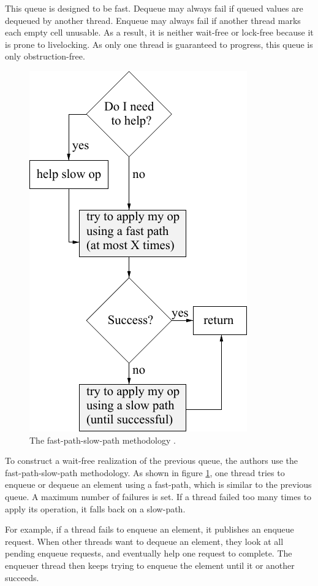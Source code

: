 This queue is designed to be fast. Dequeue may always fail if queued values are
dequeued by another thread. Enqueue may always fail if another thread marks each
empty cell unusable. As a result, it is neither wait-free or lock-free because
it is prone to livelocking. As only one thread is guaranteed to progress, this
queue is only obstruction-free. \\

\begin{figure}
    \caption{The fast-path-slow-path methodology \cite{Kogan:2012:MCF:2370036.2145835}.}
    \label{fig:fpsp}
    \center
    \includegraphics[width=0.6\linewidth]{img/fpsp.pdf}
\end{figure}

 To construct a wait-free realization of the previous
queue, the authors use the fast-path-slow-path methodology. As shown in figure
\ref{fig:fpsp}, one thread tries to enqueue or dequeue an element using a
fast-path, which is similar to the previous queue. A maximum number of failures
is set. If a thread failed too many times to apply its operation, it falls back
on a slow-path.

For example, if a thread fails to enqueue an element, it publishes an enqueue
request. When other threads want to dequeue an element, they look at all pending
enqueue requests, and eventually help one request to complete. The enqueuer
thread then keeps trying to enqueue the element until it or another succeeds.


